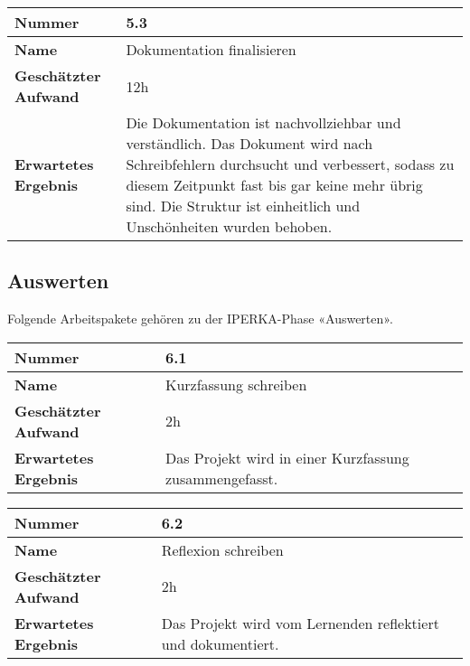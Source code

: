 \begin{longtable}{p{}|p{}}
	\hline
	\textbf{Nummer}                 & \textbf{5.3}            \\
	\hline
	\textbf{Name}   				& Dokumentation finalisieren                  \\
	\hline
	\textbf{Geschätzter Aufwand}    & 12h                                    \\
	\hline
	\textbf{Erwartetes Ergebnis}    & Die Dokumentation ist nachvollziehbar und verständlich. Das Dokument wird nach Schreibfehlern durchsucht und verbessert, sodass zu diesem Zeitpunkt fast bis gar keine mehr übrig sind. Die Struktur ist einheitlich und Unschönheiten wurden behoben.                                    \\
	\hline
\end{longtable}\label{tab:kontrollieren-5.3}

\subsection{Auswerten}
Folgende Arbeitspakete gehören zu der IPERKA-Phase «Auswerten».

\begin{longtable}{p{}|p{}}
	\hline
	\textbf{Nummer}                 & \textbf{6.1}            \\
	\hline
	\textbf{Name}   				& Kurzfassung schreiben                  \\
	\hline
	\textbf{Geschätzter Aufwand}    & 2h                                    \\
	\hline
	\textbf{Erwartetes Ergebnis}    & Das Projekt wird in einer Kurzfassung zusammengefasst.                                    \\
	\hline
\end{longtable}\label{tab:auswerten-6.1}

\begin{longtable}{p{}|p{}}
	\hline
	\textbf{Nummer}                 & \textbf{6.2}            \\
	\hline
	\textbf{Name}   				& Reflexion schreiben                  \\
	\hline
	\textbf{Geschätzter Aufwand}    & 2h                                    \\
	\hline
	\textbf{Erwartetes Ergebnis}    & Das Projekt wird vom Lernenden reflektiert und dokumentiert.                                    \\
	\hline
\end{longtable}\label{tab:auswerten-6.2}

